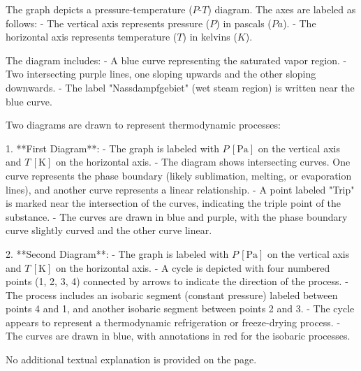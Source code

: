 The graph depicts a pressure-temperature (\(P\)-\(T\)) diagram. The axes are labeled as follows:  
- The vertical axis represents pressure (\(P\)) in pascals (\(Pa\)).  
- The horizontal axis represents temperature (\(T\)) in kelvins (\(K\)).  

The diagram includes:  
- A blue curve representing the saturated vapor region.  
- Two intersecting purple lines, one sloping upwards and the other sloping downwards.  
- The label "Nassdampfgebiet" (wet steam region) is written near the blue curve.

Two diagrams are drawn to represent thermodynamic processes:

1. **First Diagram**:  
   - The graph is labeled with \( P \, [\text{Pa}] \) on the vertical axis and \( T \, [\text{K}] \) on the horizontal axis.  
   - The diagram shows intersecting curves. One curve represents the phase boundary (likely sublimation, melting, or evaporation lines), and another curve represents a linear relationship.  
   - A point labeled "Trip" is marked near the intersection of the curves, indicating the triple point of the substance.  
   - The curves are drawn in blue and purple, with the phase boundary curve slightly curved and the other curve linear.

2. **Second Diagram**:  
   - The graph is labeled with \( P \, [\text{Pa}] \) on the vertical axis and \( T \, [\text{K}] \) on the horizontal axis.  
   - A cycle is depicted with four numbered points (1, 2, 3, 4) connected by arrows to indicate the direction of the process.  
   - The process includes an isobaric segment (constant pressure) labeled between points 4 and 1, and another isobaric segment between points 2 and 3.  
   - The cycle appears to represent a thermodynamic refrigeration or freeze-drying process.  
   - The curves are drawn in blue, with annotations in red for the isobaric processes.  

No additional textual explanation is provided on the page.